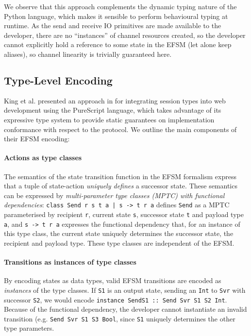 We observe that this approach complements the dynamic typing nature of the Python language, which makes it sensible to perform behavioural typing at runtime. As the send and receive IO primitives are made available to the developer, there are no ``instances'' of channel resources created, so the developer cannot explicitly hold a reference to some state in the EFSM (let alone keep aliases), so channel linearity is trivially guaranteed here.

\subsection{Type-Level Encoding}
King et al. presented an approach in \cite{PureScript2019} for integrating session types into web development using the PureScript language, which takes advantage of its expressive type system to provide static guarantees on implementation conformance with respect to the protocol. We outline the main components of their EFSM encoding:

\paragraph{Actions as type classes} The semantics of the state transition function in the EFSM formalism express that a tuple of state-action \textit{uniquely defines} a successor state. These semantics can be expressed by \textit{multi-parameter type classes (MPTC) with functional dependencies}: \texttt{class Send r s t a | s -> t r a} defines \texttt{Send} as a MPTC parameterised by recipient \texttt{r}, current state \texttt{s}, successor state \texttt{t} and payload type \texttt{a}, and \texttt{s -> t r a} expresses the functional dependency that, for an instance of this type class, the current state uniquely determines the successor state, the recipient and payload type. These type classes are independent of the EFSM.

\paragraph{Transitions as instances of type classes} By encoding states as data types, valid EFSM transitions are encoded as \textit{instances} of the type classes. If \texttt{S1} is an output state, sending an \texttt{Int} to \texttt{Svr} with successor \texttt{S2}, we would encode \texttt{instance SendS1 :: Send Svr S1 S2 Int}. Because of the functional dependency, the developer cannot instantiate an invalid transition (e.g. \texttt{Send Svr S1 S3 Bool}, since \texttt{S1} uniquely determines the other type parameters. 


